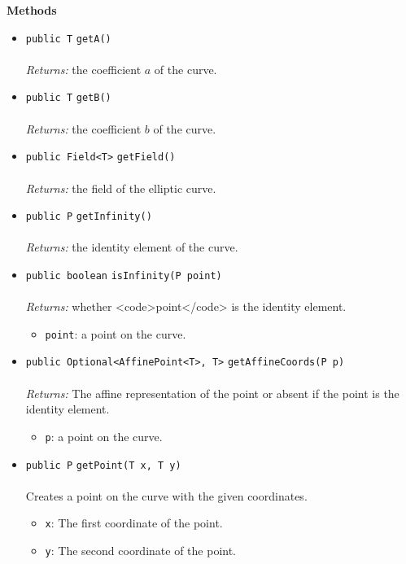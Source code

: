 \textbf{\sffamily Methods}
\begin{itemize}
\item \lstinline|public T| \lstinline|getA|\lstinline|()|\\ \\[-0.6em]
\emph{Returns:} the coefficient $a$ of the curve.



\item \lstinline|public T| \lstinline|getB|\lstinline|()|\\ \\[-0.6em]
\emph{Returns:} the coefficient $b$ of the curve.



\item \lstinline|public Field<T>| \lstinline|getField|\lstinline|()|\\ \\[-0.6em]
\emph{Returns:} the field of the elliptic curve.



\item \lstinline|public P| \lstinline|getInfinity|\lstinline|()|\\ \\[-0.6em]
\emph{Returns:} the identity element of the curve.



\item \lstinline|public boolean| \lstinline|isInfinity|\lstinline|(P point)|\\ \\[-0.6em]
\emph{Returns:} whether <code>point</code> is the identity element.
\begin{itemize}
\item \lstinline|point|: a point on the curve.
\end{itemize}



\item \lstinline|public Optional<AffinePoint<T>, T>| \lstinline|getAffineCoords|\lstinline|(P p)|\\ \\[-0.6em]
\emph{Returns:} The affine representation of the point or absent if the point is
 the identity element.
\begin{itemize}
\item \lstinline|p|: a point on the curve.
\end{itemize}



\item \lstinline|public P| \lstinline|getPoint|\lstinline|(T x, T y)|\\ \\[-0.6em]
Creates a point on the curve with the given coordinates.
\begin{itemize}
\item \lstinline|x|: The first coordinate of the point.
\item \lstinline|y|: The second coordinate of the point.
\end{itemize}




\end{itemize}
